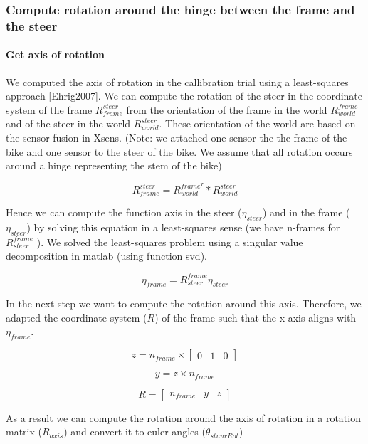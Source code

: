 \documentclass[
]{article}
\date{}
\begin{document}
\hypertarget{header-n0}{%
\subsubsection{Compute rotation around the hinge between the frame and
the steer}\label{header-n0}}

\hypertarget{header-n3}{%
\paragraph{Get axis of rotation}\label{header-n3}}

We computed the axis of rotation in the callibration trial using a
least-squares approach {[}Ehrig2007{]}. We can compute the rotation of
the steer in the coordinate system of the frame \(R^{steer}_{frame}\)
from the orientation of the frame in the world \(R^{frame}_{world}\) and
of the steer in the world \(R^{steer}_{world}\). These orientation of
the world are based on the sensor fusion in Xsens. (Note: we attached
one sensor the the frame of the bike and one sensor to the steer of the
bike. We assume that all rotation occurs around a hinge representing the
stem of the bike)

\[R^{steer}_{frame} = R^{frame^T}_{world} * R^{steer}_{world}\]

Hence we can compute the function axis in the steer (\(\eta_{steer}\))
and in the frame (\(\eta_{steer}\)) by solving this equation in a
least-squares sense (we have n-frames for \(R^{frame}_{steer}\) ). We
solved the least-squares problem using a singular value decomposition in
matlab (using function svd).

\[\eta_{frame} = R^{frame}_{steer} \eta_{steer}\]

In the next step we want to compute the rotation around this axis.
Therefore, we adapted the coordinate system (\(R\)) of the frame such
that the x-axis aligns with \(\eta_{frame}\).

\[z = n_{frame} \times \begin{bmatrix} 0 & 1 & 0 \end{bmatrix}\]

\[y = z \times n_{frame}\]

\[R = \begin{bmatrix} n_{frame} & y & z \end{bmatrix}\]

As a result we can compute the rotation around the axis of rotation in a
rotation matrix (\(R_{axis}\)) and convert it to euler angles
(\(\theta_{stuurRot}\))
\end{document}
